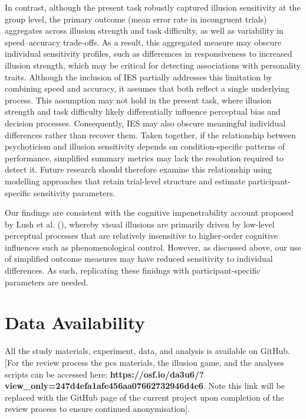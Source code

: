 \documentclass[
  man,
  floatsintext,
  longtable,
  nolmodern,
  notxfonts,
  notimes,
  colorlinks=true,linkcolor=blue,citecolor=blue,urlcolor=blue]{apa7}
\begin{document}
In contrast, although the present task robustly captured illusion
sensitivity at the group level, the primary outcome (mean error rate in
incongruent trials) aggregates across illusion strength and task
difficulty, as well as variability in speed--accuracy trade-offs. As a
result, this aggregated measure may obscure individual sensitivity
profiles, such as differemces in responsiveness to increased illusion
strength, which may be critical for detecting associations with
personality traits. Although the inclusion of IES partially addresses
this limitation by combining speed and accuracy, it assumes that both
reflect a single underlying process. This assumption may not hold in the
present task, where illusion strength and task difficulty likely
differentially influence perceptual bias and decision processes.
Consequently, IES may also obscure meaningful individual differences
rather than recover them. Taken together, if the relationship between
psychoticism and illusion sensitivity depends on condition-specific
patterns of performance, simplified summary metrics may lack the
resolution required to detect it. Future research should therefore
examine this relationship using modelling approaches that retain
trial-level structure and estimate participant-specific sensitivity
parameters.

Our findings are consistent with the cognitive impenetrability account
proposed by Lush et al. (), whereby visual
illusions are primarily driven by low-level perceptual processes that
are relatively insensitive to higher-order cognitive influences such as
phenomenological control. However, as discussed above, our use of
simplified outcome measures may have reduced sensitivity to individual
differences. As such, replicating these finidngs with
participant-specific parameters are needed.

\section{Data Availability}\label{data-availability}

All the study materials, experiment, data, and analysis is available on
GitHub. {[}For the review process the pcs materials, the illusion game,
and the analyses scripts can be accessed here:
\textbf{https://osf.io/da3u6/?view\_only=247d4efa1afe456aa07662732946d4e6}.
Note this link will be replaced with the GitHub page of the current
project upon completion of the review process to ensure continued
anonymisation{]}.
\end{document}
